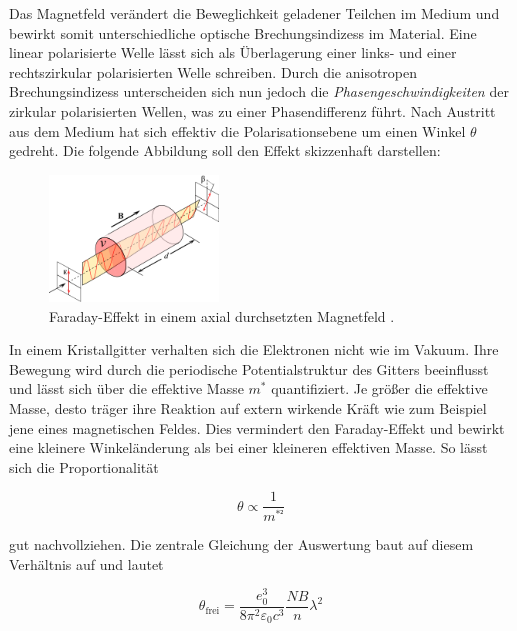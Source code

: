 \noindent Das Magnetfeld verändert die Beweglichkeit geladener Teilchen im Medium und bewirkt somit unterschiedliche optische Brechungsindizess
im Material. Eine linear polarisierte Welle lässt sich als Überlagerung einer links- und einer rechtszirkular polarisierten Welle schreiben. 
Durch die anisotropen Brechungsindizess unterscheiden sich nun jedoch die \textit{Phasengeschwindigkeiten} der zirkular polarisierten Wellen, 
was zu einer Phasendifferenz führt. Nach Austritt aus dem Medium hat sich effektiv die Polarisationsebene um einen Winkel $\theta$ gedreht. 
Die folgende Abbildung soll den Effekt skizzenhaft darstellen:

\begin{figure}[H]
    \centering
    \includegraphics[width=0.4\textwidth]{content/Faraday.png}
    \caption{Faraday-Effekt in einem axial durchsetzten Magnetfeld \cite{Faraday}.}
    \label{fig:Faraday}
\end{figure}

\noindent In einem Kristallgitter verhalten sich die Elektronen nicht wie im Vakuum. Ihre Bewegung wird durch die periodische Potentialstruktur
des Gitters beeinflusst und lässt sich über die effektive Masse $m^{\ast}$ quantifiziert. Je größer die effektive Masse, desto träger 
ihre Reaktion auf extern wirkende Kräft wie zum Beispiel jene eines magnetischen Feldes. Dies vermindert den Faraday-Effekt und bewirkt 
eine kleinere Winkeländerung als bei einer kleineren effektiven Masse. So lässt sich die Proportionalität

\begin{equation}
    \theta \propto \frac{1}{m^{\ast²}}
\end{equation}

\noindent gut nachvollziehen. Die zentrale Gleichung der Auswertung baut auf diesem Verhältnis auf und lautet

\begin{equation}
    \theta_\text{frei} = \frac{e_0^3}{8 \pi ^2 \varepsilon_0c^3} \frac{NB}{n} \lambda ^2
    \label{eqn:Winkel_frei}
\end{equation}

